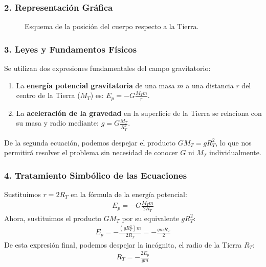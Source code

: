 \subsubsection*{2. Representación Gráfica}
\begin{figure}[H]
    \centering
    \caption{Esquema de la posición del cuerpo respecto a la Tierra.}
\end{figure}

\subsubsection*{3. Leyes y Fundamentos Físicos}
Se utilizan dos expresiones fundamentales del campo gravitatorio:
\begin{enumerate}
    \item La \textbf{energía potencial gravitatoria} de una masa $m$ a una distancia $r$ del centro de la Tierra ($M_T$) es: $E_p = -G \frac{M_T m}{r}$.
    \item La \textbf{aceleración de la gravedad} en la superficie de la Tierra se relaciona con su masa y radio mediante: $g = G \frac{M_T}{R_T^2}$.
\end{enumerate}
De la segunda ecuación, podemos despejar el producto $G M_T = g R_T^2$, lo que nos permitirá resolver el problema sin necesidad de conocer $G$ ni $M_T$ individualmente.

\subsubsection*{4. Tratamiento Simbólico de las Ecuaciones}
Sustituimos $r=2R_T$ en la fórmula de la energía potencial:
\begin{gather}
    E_p = -G \frac{M_T m}{2R_T}
\end{gather}
Ahora, sustituimos el producto $G M_T$ por su equivalente $g R_T^2$:
\begin{gather}
    E_p = - \frac{(g R_T^2) m}{2R_T} = - \frac{g m R_T}{2}
\end{gather}
De esta expresión final, podemos despejar la incógnita, el radio de la Tierra $R_T$:
\begin{gather}
    R_T = - \frac{2 E_p}{g m}
\end{gather}

